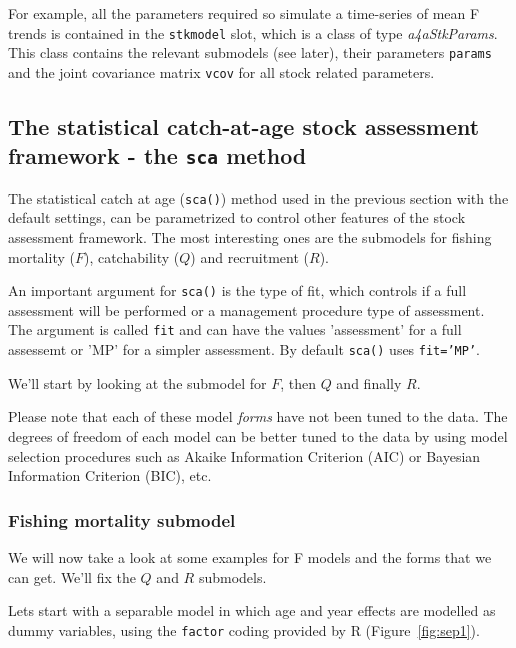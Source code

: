 \documentclass[a4paper,english,10pt]{article}\usepackage[]{graphicx}\usepackage[]{color}
\newcommand{\code}[1]{{\texttt{#1}}}
\newcommand{\class}[1]{{\textit{#1}}}
\begin{document}
For example, all the parameters required so simulate a time-series of mean F trends is contained in the \code{stkmodel} slot, which is a class of type \class{a4aStkParams}. This class contains the relevant submodels (see later), their parameters \code{params} and the joint covariance matrix \code{vcov} for all stock related parameters.

\subsection{The statistical catch-at-age stock assessment framework - the \code{sca} method}

The statistical catch at age (\code{sca()}) method used in the previous section with the default settings, can be parametrized to control other features of the stock assessment framework. The most interesting ones are the submodels for fishing mortality ($F$), catchability ($Q$) and recruitment ($R$). 

An important argument for \code{sca()} is the type of fit, which controls if a full assessment will be performed or a management procedure type of assessment. The argument is called \code{fit} and can have the values 'assessment' for a full assessemt or 'MP' for a simpler assessment. By default \code{sca()} uses \code{fit='MP'}. 

We'll start by looking at the submodel for $F$, then $Q$ and finally $R$.

Please note that each of these model \emph{forms} have not been tuned to the data. The degrees of freedom of each model can be better tuned to the data by using model selection procedures such as Akaike Information Criterion (AIC) or Bayesian Information Criterion (BIC), etc.

\subsubsection{Fishing mortality submodel}

We will now take a look at some examples for F models and the forms that we can get. We'll fix the $Q$ and $R$ submodels. 

Lets start with a separable model in which age and year effects are modelled as dummy variables, using the \code{factor} coding provided by R (Figure~\ref{fig:sep1}). 
\end{document}
